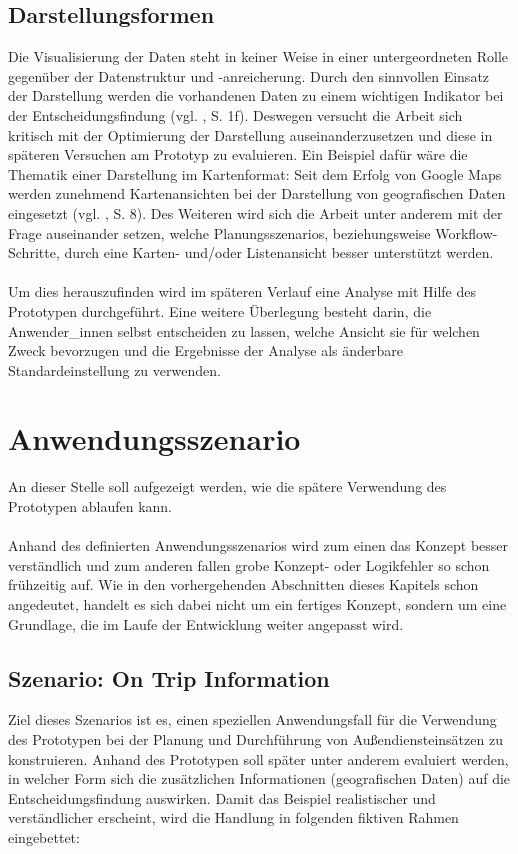 \documentclass[Bachelorarbeit.tex]{subfiles}
\begin{document}
\subsection*{Darstellungsformen}
Die Visualisierung der Daten steht in keiner Weise in einer untergeordneten Rolle gegenüber der Datenstruktur und -anreicherung.
Durch den sinnvollen Einsatz der Darstellung werden die vorhandenen Daten zu einem wichtigen Indikator bei der Entscheidungsfindung (vgl. \cite{Reiterer2000}, S. 1f).
Deswegen versucht die Arbeit sich kritisch mit der Optimierung der Darstellung auseinanderzusetzen und diese in späteren Versuchen am Prototyp zu evaluieren.
Ein Beispiel dafür wäre die Thematik einer Darstellung im Kartenformat:
Seit dem Erfolg von Google Maps werden zunehmend Kartenansichten bei der Darstellung von geografischen Daten eingesetzt (vgl. \cite{Mitchell2008}, S. 8). 
Des Weiteren wird sich die Arbeit unter anderem mit der Frage auseinander setzen, welche Planungsszenarios, beziehungsweise Workflow-Schritte, durch eine Karten- und/oder Listenansicht besser unterstützt werden.\\
\\
Um dies herauszufinden wird im späteren Verlauf eine Analyse mit Hilfe des Prototypen durchgeführt.
Eine weitere Überlegung besteht darin, die Anwender\_innen selbst entscheiden zu lassen, welche Ansicht sie für welchen Zweck bevorzugen und die Ergebnisse der Analyse als änderbare Standardeinstellung zu verwenden.


\section{Anwendungsszenario}
\label{sec:anwendungsszenario}
An dieser Stelle soll aufgezeigt werden, wie die spätere Verwendung des Prototypen ablaufen kann.\\
\\
Anhand des definierten Anwendungsszenarios wird zum einen das Konzept besser verständlich und zum anderen fallen grobe Konzept- oder Logikfehler so schon frühzeitig auf.
Wie in den vorhergehenden Abschnitten dieses Kapitels schon angedeutet, handelt es sich dabei nicht um ein fertiges Konzept, sondern um eine Grundlage, die im Laufe der Entwicklung weiter angepasst wird.

\subsection{Szenario: On Trip Information }
Ziel dieses Szenarios ist es, einen speziellen Anwendungsfall für die Verwendung des Prototypen bei der Planung und Durchführung von Außendiensteinsätzen zu konstruieren. 
Anhand des Prototypen soll später unter anderem evaluiert werden, in welcher Form sich die zusätzlichen Informationen (geografischen Daten) auf die Entscheidungsfindung auswirken.
Damit das Beispiel realistischer und verständlicher erscheint, wird die Handlung in folgenden fiktiven Rahmen eingebettet:\\
\end{document}
